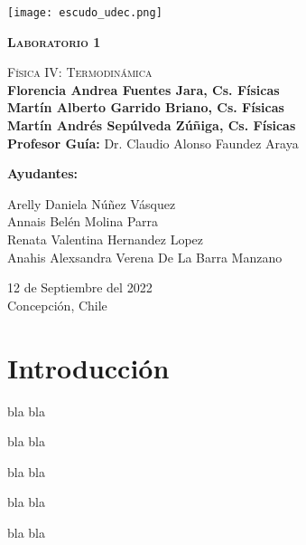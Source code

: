 \documentclass[twoside]{report}
\begin{document}

\begin{titlepage}
  \thispagestyle{frontpage}
 \begin{center}
     \texttt{[image: escudo\_udec.png]}
     
     \vspace*{3\baselineskip}
  \textsc{\Huge \textbf{Laboratorio 1}}
  
     \vspace*{1.5\baselineskip}
  \textsc{\Huge Física IV: Termodinámica}\\

     \vspace*{4\baselineskip}
  \Large{\textbf{Florencia Andrea Fuentes Jara, Cs. Físicas\\ Martín Alberto Garrido Briano, Cs. Físicas \\ Martín Andrés Sepúlveda Zúñiga, Cs. Físicas}}\\ 
    \vspace{2\baselineskip}
 \Large{\textbf{Profesor Guía:} Dr. Claudio Alonso Faundez Araya}\\
     \vspace{1\baselineskip}
     \begin{center}
        \justify\Large{\textbf{Ayudantes:} 
        
    Arelly Daniela Núñez Vásquez  \\ Annais Belén Molina Parra \\  Renata Valentina Hernandez Lopez \\ Anahis Alexsandra Verena De La Barra Manzano}
    \vspace{2\baselineskip} 
     \end{center}
 
    
         12 de Septiembre del 2022 \\
            Concepción, Chile 
\end{center}
  
  \vspace*{4\baselineskip}
  
\end{titlepage}
 
 \chapter*{Introducción}
bla bla

\medskip
bla bla

\medskip
bla bla

\medskip
bla bla

\medskip
bla bla
\medskip
\end{document}
